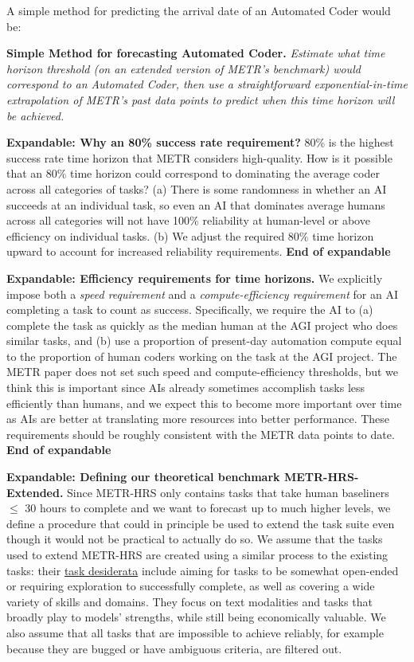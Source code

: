 \documentclass{article}
\theoremstyle{definition}
\begin{document}
A simple method for predicting the arrival date of an Automated Coder would be:

\textbf{Simple Method for forecasting Automated Coder.} \textit{Estimate what time horizon threshold (on an extended version of METR's benchmark) would correspond to an Automated Coder, then use a straightforward exponential-in-time extrapolation of METR's past data points to predict when this time horizon will be achieved.}

\textbf{Expandable: Why an 80\% success rate requirement?} 80\% is the highest success rate time horizon that METR considers high-quality. How is it possible that an 80\% time horizon could correspond to dominating the average coder across all categories of tasks? (a) There is some randomness in whether an AI succeeds at an individual task, so even an AI that dominates average humans across all categories will not have 100\% reliability at human-level or above efficiency on individual tasks. (b) We adjust the required 80\% time horizon upward to account for increased reliability requirements. 
\textbf{End of expandable}

\textbf{Expandable: Efficiency requirements for time horizons.} We explicitly impose both a \textit{speed requirement} and a \textit{compute-efficiency requirement} for an AI completing a task to count as success. Specifically, we require the AI to (a) complete the task as quickly as the median human at the AGI project who does similar tasks, and (b) use a proportion of present-day automation compute equal to the proportion of human coders working on the task at the AGI project. The METR paper does not set such speed and compute-efficiency thresholds, but we think this is important since AIs already sometimes accomplish tasks less efficiently than humans, and we expect this to become more important over time as AIs are better at translating more resources into better performance. These requirements should be roughly consistent with the METR data points to date.
\textbf{End of expandable}

\textbf{Expandable: Defining our theoretical benchmark METR-HRS-Extended.} Since METR-HRS only contains tasks that take human baseliners $\leq$ 30 hours to complete and we want to forecast up to much higher levels, we define a procedure that could in principle be used to extend the task suite even though it would not be practical to actually do so. We assume that the tasks used to extend METR-HRS are created using a similar process to the existing tasks: their \href{https://arxiv.org/pdf/2503.17354#page=4.54}{task desiderata} include aiming for tasks to be somewhat open-ended or requiring exploration to successfully complete, as well as covering a wide variety of skills and domains. They focus on text modalities and tasks that broadly play to models' strengths, while still being economically valuable. We also assume that all tasks that are impossible to achieve reliably, for example because they are bugged or have ambiguous criteria, are filtered out. 
\end{document}
